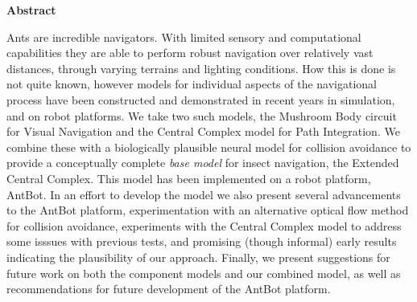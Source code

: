 \documentclass[a4paper,11pt,twoside,openright]{article}
\begin{document}
\centering
{\LARGE\textbf{Abstract}}
\begin{flushleft}
  {\small Ants are incredible navigators. With limited sensory and
    computational capabilities they are able to perform robust
    navigation over relatively vast distances, through varying
    terrains and lighting conditions. How this is done is not quite
    known, however models for individual aspects of the navigational
    process have been constructed and demonstrated in recent years in
    simulation, and on robot platforms.  We take two such models, the
    Mushroom Body circuit for Visual Navigation and the Central
    Complex model for Path Integration. We combine these with a
    biologically plausible neural model for collision avoidance to
    provide a conceptually complete \textit{base model} for insect
    navigation, the Extended Central Complex. This model has been
    implemented on a robot platform, AntBot. In an effort to develop
    the model we also present several advancements to the AntBot
    platform, experimentation with an alternative optical flow method
    for collision avoidance, experiments with the Central Complex
    model to address some isssues with previous tests, and promising
    (though informal) early results indicating the plausibility of our
    approach. Finally, we present suggestions for future work on both
    the component models and our combined model, as well as
    recommendations for future development of the AntBot platform.}
\end{flushleft}
\newpage

\tableofcontents
\newpage

\listoffigures
\newpage

\listoftables
\newpage
\thispagestyle{empty}
\mbox{}
\newpage
\end{document}
